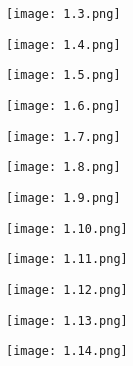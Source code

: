 \documentclass[12pt]{article}
\begin{document}
\begin{figure}[H]
    \centering
    \texttt{[image: 1.3.png]}
\end{figure}

\begin{figure}[H]
    \centering
    \texttt{[image: 1.4.png]}
\end{figure}

\begin{figure}[H]
    \centering
    \texttt{[image: 1.5.png]}
\end{figure}

\begin{figure}[H]
    \centering
    \texttt{[image: 1.6.png]}
\end{figure}

\begin{figure}[H]
    \centering
    \texttt{[image: 1.7.png]}
\end{figure}

\begin{figure}[H]
    \centering
    \texttt{[image: 1.8.png]}
\end{figure}

\begin{figure}[H]
    \centering
    \texttt{[image: 1.9.png]}
\end{figure}

\begin{figure}[H]
    \centering
    \texttt{[image: 1.10.png]}
\end{figure}

\begin{figure}[H]
    \centering
    \texttt{[image: 1.11.png]}
\end{figure}

\begin{figure}[H]
    \centering
    \texttt{[image: 1.12.png]}
\end{figure}

\begin{figure}[H]
    \centering
    \texttt{[image: 1.13.png]}
\end{figure}

\begin{figure}[H]
    \centering
    \texttt{[image: 1.14.png]}
\end{figure}
\end{document}
